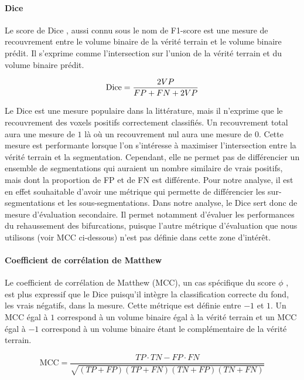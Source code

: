 \paragraph{Dice}

Le score de Dice \cite{Dice1945_Dice}, aussi connu sous le nom de F1-score est une mesure de recouvrement entre le volume binaire de la vérité terrain et le volume binaire prédit. Il s'exprime comme l'intersection sur l'union de la vérité terrain et du volume binaire prédit.

\begin{equation}
  \textrm{Dice} = \frac{2 VP}{FP + FN + 2 VP} \\ 
  \label{eq:Dice}
\end{equation}

Le Dice est une mesure populaire dans la littérature, mais il n'exprime que le recouvrement des voxels positifs correctement classifiés. Un recouvrement total aura une mesure de $1$ là où un recouvrement nul aura une mesure de $0$. Cette mesure est performante lorsque l'on s'intéresse à maximiser l'intersection entre la vérité terrain et la segmentation. Cependant, elle ne permet pas de différencier un ensemble de segmentations qui auraient un nombre similaire de vrais positifs, mais dont la proportion de FP et de FN est différente. Pour notre analyse, il est en effet souhaitable d'avoir une métrique qui permette de différencier les sur-segmentations et les sous-segmentations. Dans notre analyse, le Dice sert donc de mesure d'évaluation secondaire. Il permet notamment d'évaluer les performances du rehaussement des bifurcations, puisque l'autre métrique d'évaluation que nous utilisons (voir MCC ci-dessous) n'est pas définie dans cette zone d'intérêt.

\paragraph{Coefficient de corrélation de Matthew}

Le coefficient de corrélation de Matthew (MCC), un cas spécifique du score $\phi$ \cite{Chicco2020_advantages_MCC_Dice}, est plus  expressif que le Dice puisqu'il intègre la classification correcte du fond, les vrais négatifs, dans la mesure. Cette métrique est définie entre $-1$ et $1$. Un MCC égal à $1$ correspond à un volume binaire égal à la vérité terrain et un MCC égal à $-1$ correspond à un volume binaire étant le complémentaire de la vérité terrain.

\begin{equation}
  \textrm{MCC} = \frac{TP \cdot TN - FP \cdot FN}{\sqrt{(TP+FP)(TP+FN)(TN+FP)(TN+FN)}}
  \label{eq:MCC}
\end{equation}

